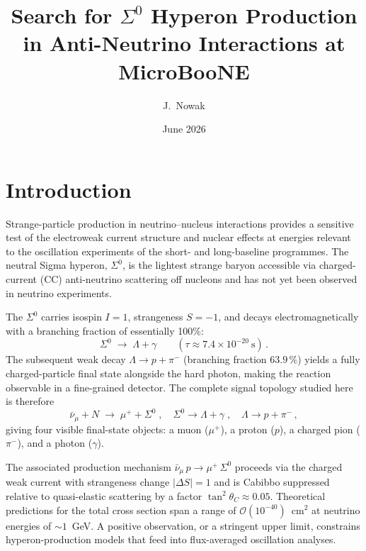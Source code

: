 \documentclass[12pt,a4paper]{article}
\title{Search for $\Sigma^0$ Hyperon Production\\
       in Anti-Neutrino Interactions at MicroBooNE}
\author{J.~Nowak}
\date{June 2026}
\begin{document}
\maketitle
\tableofcontents
\clearpage

\section{Introduction}

Strange-particle production in neutrino--nucleus interactions provides
a sensitive test of the electroweak current structure and nuclear effects
at energies relevant to the oscillation experiments of the short- and
long-baseline programmes.  The neutral Sigma hyperon, $\Sigma^0$, is
the lightest strange baryon accessible via charged-current (CC)
anti-neutrino scattering off nucleons and has not yet been observed in
neutrino experiments.

The $\Sigma^0$ carries isospin $I = 1$, strangeness $S = -1$, and decays
electromagnetically with a branching fraction of essentially 100\%:
\begin{equation}
  \Sigma^0 \;\to\; \Lambda + \gamma
  \qquad (\tau \approx 7.4\times10^{-20}~\text{s})\,.
  \label{eq:sigma_decay}
\end{equation}
The subsequent weak decay $\Lambda \to p + \pi^-$ (branching fraction
$63.9\,\%$) yields a fully charged-particle final state alongside the
hard photon, making the reaction observable in a fine-grained detector.
The complete signal topology studied here is therefore
\begin{equation}
  \bar\nu_\mu + N \;\to\; \mu^+ + \Sigma^0 \;,\quad
  \Sigma^0 \to \Lambda + \gamma \;,\quad
  \Lambda \to p + \pi^-\,,
  \label{eq:signal}
\end{equation}
giving four visible final-state objects: a muon ($\mu^+$), a proton
($p$), a charged pion ($\pi^-$), and a photon ($\gamma$).

The associated production mechanism $\bar\nu_\mu\,p \to \mu^+\,\Sigma^0$
proceeds via the charged weak current with strangeness change
$|\Delta S| = 1$ and is Cabibbo suppressed relative to quasi-elastic
scattering by a factor $\tan^2\theta_C \approx 0.05$.  Theoretical
predictions for the total cross section span a range of
$\mathcal{O}(10^{-40})$~cm$^2$ at neutrino energies of $\sim 1$~GeV.
A positive observation, or a stringent upper limit, constrains
hyperon-production models that feed into flux-averaged oscillation
analyses.
\end{document}
